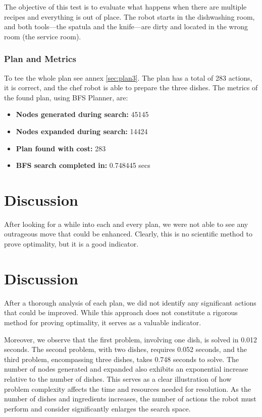 \documentclass[a4paper,12pt]{article}
\begin{document}
The objective of this test is to evaluate what happens when there are multiple recipes and everything is out of place. The robot starts in the dishwashing room, and both tools—the spatula and the knife—are dirty and located in the wrong room (the service room).

\subsubsection{Plan and Metrics}
To tee the whole plan see annex \ref{sec:plan3}. The plan has a total of 283 actions, it is correct, and the chef robot is able to prepare the three dishes. The metrics of the found plan, using BFS Planner, are:

\begin{itemize}
    \item \textbf{Nodes generated during search:} 45145
    \item \textbf{Nodes expanded during search:} 14424
    \item \textbf{Plan found with cost:} 283
    \item \textbf{BFS search completed in:} 0.748445 secs
\end{itemize}


\section{Discussion}
\label{sec:discussion}
After looking for a while into each and every plan, we were not able to see any outrageous move that could be enhanced. Clearly, this is no scientific method to prove optimality, but it is a good indicator.
\section{Discussion}
\label{sec:discussion}
After a thorough analysis of each plan, we did not identify any significant actions that could be improved. While this approach does not constitute a rigorous method for proving optimality, it serves as a valuable indicator.

Moreover, we observe that the first problem, involving one dish, is solved in 0.012 seconds. The second problem, with two dishes, requires 0.052 seconds, and the third problem, encompassing three dishes, takes 0.748 seconds to solve. The number of nodes generated and expanded also exhibits an exponential increase relative to the number of dishes. This serves as a clear illustration of how problem complexity affects the time and resources needed for resolution. As the number of dishes and ingredients increases, the number of actions the robot must perform and consider significantly enlarges the search space.
\end{document}
